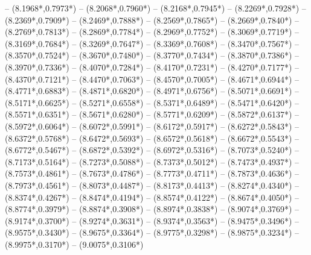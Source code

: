 {	-- ({8.1968*\dx},{0.7973*\dy})
	-- ({8.2068*\dx},{0.7960*\dy})
	-- ({8.2168*\dx},{0.7945*\dy})
	-- ({8.2269*\dx},{0.7928*\dy})
	-- ({8.2369*\dx},{0.7909*\dy})
	-- ({8.2469*\dx},{0.7888*\dy})
	-- ({8.2569*\dx},{0.7865*\dy})
	-- ({8.2669*\dx},{0.7840*\dy})
	-- ({8.2769*\dx},{0.7813*\dy})
	-- ({8.2869*\dx},{0.7784*\dy})
	-- ({8.2969*\dx},{0.7752*\dy})
	-- ({8.3069*\dx},{0.7719*\dy})
	-- ({8.3169*\dx},{0.7684*\dy})
	-- ({8.3269*\dx},{0.7647*\dy})
	-- ({8.3369*\dx},{0.7608*\dy})
	-- ({8.3470*\dx},{0.7567*\dy})
	-- ({8.3570*\dx},{0.7524*\dy})
	-- ({8.3670*\dx},{0.7480*\dy})
	-- ({8.3770*\dx},{0.7434*\dy})
	-- ({8.3870*\dx},{0.7386*\dy})
	-- ({8.3970*\dx},{0.7336*\dy})
	-- ({8.4070*\dx},{0.7284*\dy})
	-- ({8.4170*\dx},{0.7231*\dy})
	-- ({8.4270*\dx},{0.7177*\dy})
	-- ({8.4370*\dx},{0.7121*\dy})
	-- ({8.4470*\dx},{0.7063*\dy})
	-- ({8.4570*\dx},{0.7005*\dy})
	-- ({8.4671*\dx},{0.6944*\dy})
	-- ({8.4771*\dx},{0.6883*\dy})
	-- ({8.4871*\dx},{0.6820*\dy})
	-- ({8.4971*\dx},{0.6756*\dy})
	-- ({8.5071*\dx},{0.6691*\dy})
	-- ({8.5171*\dx},{0.6625*\dy})
	-- ({8.5271*\dx},{0.6558*\dy})
	-- ({8.5371*\dx},{0.6489*\dy})
	-- ({8.5471*\dx},{0.6420*\dy})
	-- ({8.5571*\dx},{0.6351*\dy})
	-- ({8.5671*\dx},{0.6280*\dy})
	-- ({8.5771*\dx},{0.6209*\dy})
	-- ({8.5872*\dx},{0.6137*\dy})
	-- ({8.5972*\dx},{0.6064*\dy})
	-- ({8.6072*\dx},{0.5991*\dy})
	-- ({8.6172*\dx},{0.5917*\dy})
	-- ({8.6272*\dx},{0.5843*\dy})
	-- ({8.6372*\dx},{0.5768*\dy})
	-- ({8.6472*\dx},{0.5693*\dy})
	-- ({8.6572*\dx},{0.5618*\dy})
	-- ({8.6672*\dx},{0.5543*\dy})
	-- ({8.6772*\dx},{0.5467*\dy})
	-- ({8.6872*\dx},{0.5392*\dy})
	-- ({8.6972*\dx},{0.5316*\dy})
	-- ({8.7073*\dx},{0.5240*\dy})
	-- ({8.7173*\dx},{0.5164*\dy})
	-- ({8.7273*\dx},{0.5088*\dy})
	-- ({8.7373*\dx},{0.5012*\dy})
	-- ({8.7473*\dx},{0.4937*\dy})
	-- ({8.7573*\dx},{0.4861*\dy})
	-- ({8.7673*\dx},{0.4786*\dy})
	-- ({8.7773*\dx},{0.4711*\dy})
	-- ({8.7873*\dx},{0.4636*\dy})
	-- ({8.7973*\dx},{0.4561*\dy})
	-- ({8.8073*\dx},{0.4487*\dy})
	-- ({8.8173*\dx},{0.4413*\dy})
	-- ({8.8274*\dx},{0.4340*\dy})
	-- ({8.8374*\dx},{0.4267*\dy})
	-- ({8.8474*\dx},{0.4194*\dy})
	-- ({8.8574*\dx},{0.4122*\dy})
	-- ({8.8674*\dx},{0.4050*\dy})
	-- ({8.8774*\dx},{0.3979*\dy})
	-- ({8.8874*\dx},{0.3908*\dy})
	-- ({8.8974*\dx},{0.3838*\dy})
	-- ({8.9074*\dx},{0.3769*\dy})
	-- ({8.9174*\dx},{0.3700*\dy})
	-- ({8.9274*\dx},{0.3631*\dy})
	-- ({8.9374*\dx},{0.3563*\dy})
	-- ({8.9475*\dx},{0.3496*\dy})
	-- ({8.9575*\dx},{0.3430*\dy})
	-- ({8.9675*\dx},{0.3364*\dy})
	-- ({8.9775*\dx},{0.3298*\dy})
	-- ({8.9875*\dx},{0.3234*\dy})
	-- ({8.9975*\dx},{0.3170*\dy})
	-- ({9.0075*\dx},{0.3106*\dy})
}
